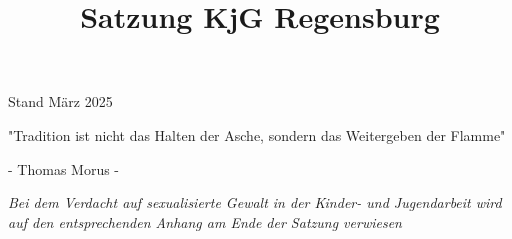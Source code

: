 \documentclass[12pt]{report}
\title{Satzung KjG Regensburg}
\author{}
\begin{document}
 
  \begin{center}
    \pagestyle{empty}
    \BgThispage
    \vspace*{\fill}
    \begin{Huge}
      { \color{kjgtuerkis}  Stand März 2025}
    \end{Huge}
    \vspace*{\fill}
    \newpage
    \pagestyle{empty}
    \vspace*{\fill}
   { \selectfont
     \begin{Huge}
     "Tradition ist nicht das Halten der Asche, sondern das Weitergeben der Flamme"
     \end{Huge}
    }
    \newline
    \begin{large}
      - Thomas Morus -
    \end{large}
    \vspace*{\fill}
  \end{center}

  \tableofcontents
  \begin{flushleft}
   \it{ Bei dem Verdacht auf sexualisierte Gewalt in der Kinder- und Jugendarbeit wird auf den entsprechenden
        Anhang am Ende der Satzung verwiesen}
  \end{flushleft}
  \newpage  
  \setcounter{page}{1}
\end{document}
